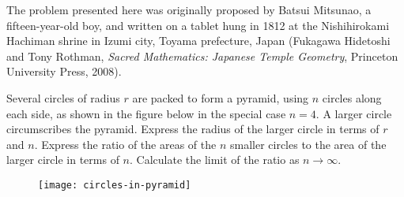 The problem presented here was originally proposed by Batsui Mitsunao, a fifteen-year-old boy, and written on a tablet hung in 1812 at the Nishihirokami Hachiman shrine in Izumi city, Toyama prefecture, Japan (Fukagawa Hidetoshi and Tony Rothman, \textit{Sacred Mathematics: Japanese Temple Geometry}, Princeton University Press, 2008). 

Several circles of radius $r$ are packed to form a pyramid, using $n$ circles along each side, as shown in the figure below in the special case $n=4$. A larger circle circumscribes the pyramid. Express the radius of the larger circle in terms of $r$ and $n$. Express the ratio of the areas of the $n$ smaller circles to the area of the larger circle in terms of $n$. Calculate the limit of the ratio as $n\rightarrow\infty$. 

\begin{figure}[H]
\centering
\texttt{[image: circles-in-pyramid]}
\end{figure}
